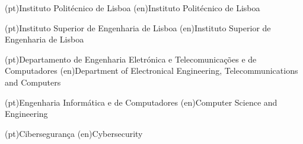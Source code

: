 
%



\ncuniversity*(pt){Instituto Politécnico de Lisboa}
\ncuniversity*(en){Instituto Politécnico de Lisboa}

\ncschool*(pt){Instituto Superior de Engenharia de Lisboa}
\ncschool*(en){Instituto Superior de Engenharia de Lisboa}

\ncdepartment*(pt){Departamento de Engenharia Eletrónica e Telecomunicações e de Computadores}
\ncdepartment*(en){Department of Electronical Engineering, Telecommunications and Computers}



\ncmajorfield(pt){Engenharia Informática e de Computadores}
\ncmajorfield(en){Computer Science and Engineering}




\ncspecialization(pt){Cibersegurança}
\ncspecialization(en){Cybersecurity}
